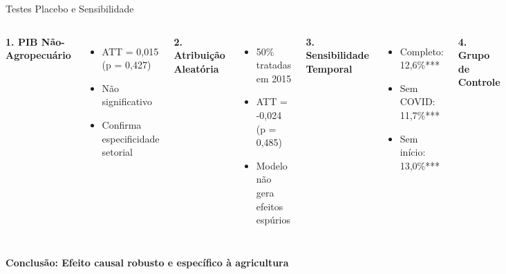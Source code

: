 \documentclass[10pt,aspectratio=169]{beamer}
\begin{document}
\begin{frame}{Testes Placebo e Sensibilidade}
\begin{columns}
\textbf{1. PIB Não-Agropecuário}
\begin{itemize}
    \item ATT = 0,015 (p = 0,427)
    \item Não significativo
    \item Confirma especificidade setorial
\end{itemize}

\vspace{0.3cm}
\textbf{2. Atribuição Aleatória}
\begin{itemize}
    \item 50\% tratadas em 2015
    \item ATT = -0,024 (p = 0,485)
    \item Modelo não gera efeitos espúrios
\end{itemize}

\textbf{3. Sensibilidade Temporal}
\begin{itemize}
    \item Completo: 12,6\%***
    \item Sem COVID: 11,7\%***
    \item Sem início: 13,0\%***
\end{itemize}

\vspace{0.3cm}
\textbf{4. Grupo de Controle}
\begin{itemize}
    \item Not-yet-treated: 8,2\%***
    \item Never-treated: 8,0\%**
\end{itemize}
\end{columns}

\vspace{0.5cm}
\begin{center}
\textbf{Conclusão: Efeito causal robusto e específico à agricultura}
\end{center}
\end{frame}
\end{document}
